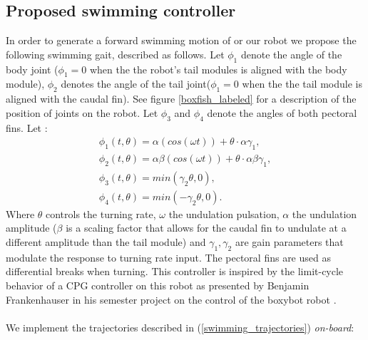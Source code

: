 \documentclass[11pt]{article}
\begin{document}
\subsection{Proposed swimming controller}

In order to generate a forward swimming motion of or our robot we propose the following swimming gait, described as follows. Let $\phi_1$ denote the angle of the body joint ($\phi_1 = 0$ when the the robot's tail modules is aligned with the body module), $\phi_2$ denotes the angle of the tail joint($\phi_1 = 0$ when the the tail module is aligned with the caudal fin). See figure \ref{boxfish_labeled} for a description of the position of joints on the robot. Let $\phi_3$ and $\phi_4$ denote the angles of both pectoral fins. Let : 
\begin{equation}
\label{swimming_trajectories}
\begin{aligned}
    \phi_1(t, \theta) = \alpha \left( cos(\omega t) \right) + \theta \cdot \alpha \gamma_1, \\
    \phi_2(t, \theta) = \alpha \beta \left( cos(\omega t) \right) + \theta \cdot \alpha \beta \gamma_1, \\
    \phi_3(t, \theta) = min(\gamma_2 \theta, 0),\\
    \phi_4(t, \theta) = min(-\gamma_2 \theta, 0).
\end{aligned}
\end{equation}
Where $\theta$ controls the turning rate, $\omega$ the undulation pulsation, $\alpha$ the undulation amplitude ($\beta$ is a scaling factor that allows for the caudal fin to undulate at a different amplitude than the tail module) and $\gamma_1, \gamma_2$ are gain parameters that modulate the response to turning rate input. The pectoral fins are used as differential breaks when turning. This controller is inspired by the limit-cycle behavior of a CPG controller on this robot as presented by Benjamin Frankenhauser in his semester project on the control of the boxybot robot \cite{boxybot_2}. 
\\
\\
We implement the trajectories described in (\ref{swimming_trajectories}) \textit{on-board}: 
\end{document}
